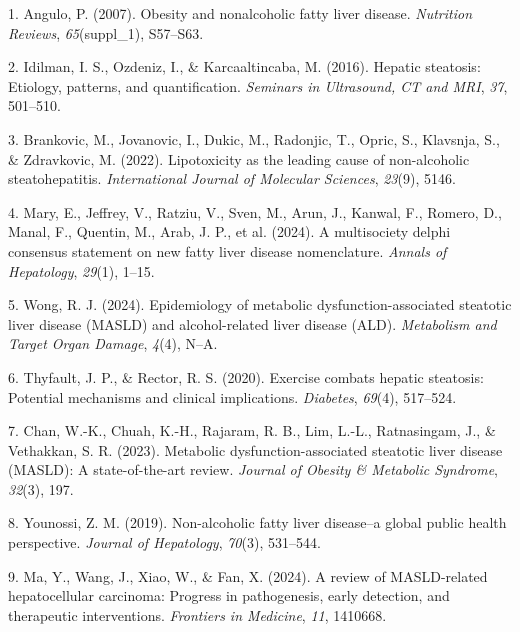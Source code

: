 \documentclass[
  11pt,
  letterpaper,
]{book}
\newlength{\cslhangindent}
\newenvironment{CSLReferences}[2] %
 {\begin{list}{}{%
  \setlength{\itemindent}{0pt}
  \setlength{\leftmargin}{0pt}
  \setlength{\parsep}{0pt}
  \ifodd #1
   \setlength{\leftmargin}{\cslhangindent}
   \setlength{\itemindent}{-1\cslhangindent}
  \fi
  \setlength{\itemsep}{#2\baselineskip}}}
 {\end{list}}
\begin{document}
\label{refs}
\begin{CSLReferences}{1}{0}
1. Angulo, P. (2007). Obesity and nonalcoholic fatty liver disease.
\emph{Nutrition Reviews}, \emph{65}(suppl\_1), S57--S63.

2. Idilman, I. S., Ozdeniz, I., \& Karcaaltincaba, M. (2016). Hepatic
steatosis: Etiology, patterns, and quantification. \emph{Seminars in
Ultrasound, CT and MRI}, \emph{37}, 501--510.

3. Brankovic, M., Jovanovic, I., Dukic, M., Radonjic, T., Opric, S.,
Klavsnja, S., \& Zdravkovic, M. (2022). Lipotoxicity as the leading
cause of non-alcoholic steatohepatitis. \emph{International Journal of
Molecular Sciences}, \emph{23}(9), 5146.

4. Mary, E., Jeffrey, V., Ratziu, V., Sven, M., Arun, J., Kanwal, F.,
Romero, D., Manal, F., Quentin, M., Arab, J. P., et al. (2024). A
multisociety delphi consensus statement on new fatty liver disease
nomenclature. \emph{Annals of Hepatology}, \emph{29}(1), 1--15.

5. Wong, R. J. (2024). Epidemiology of metabolic dysfunction-associated
steatotic liver disease (MASLD) and alcohol-related liver disease (ALD).
\emph{Metabolism and Target Organ Damage}, \emph{4}(4), N--A.

6. Thyfault, J. P., \& Rector, R. S. (2020). Exercise combats hepatic
steatosis: Potential mechanisms and clinical implications.
\emph{Diabetes}, \emph{69}(4), 517--524.

7. Chan, W.-K., Chuah, K.-H., Rajaram, R. B., Lim, L.-L., Ratnasingam,
J., \& Vethakkan, S. R. (2023). Metabolic dysfunction-associated
steatotic liver disease (MASLD): A state-of-the-art review.
\emph{Journal of Obesity \& Metabolic Syndrome}, \emph{32}(3), 197.

8. Younossi, Z. M. (2019). Non-alcoholic fatty liver disease--a global
public health perspective. \emph{Journal of Hepatology}, \emph{70}(3),
531--544.

9. Ma, Y., Wang, J., Xiao, W., \& Fan, X. (2024). A review of
MASLD-related hepatocellular carcinoma: Progress in pathogenesis, early
detection, and therapeutic interventions. \emph{Frontiers in Medicine},
\emph{11}, 1410668.


\end{CSLReferences}
\end{document}
